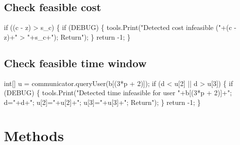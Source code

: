 \subsection{Check feasible cost}
\nwenddocs{}\endmoddef\nwstartdeflinemarkup{}\nwenddeflinemarkup
if ((c - z) > s_c) \{
  if (DEBUG) \{
    tools.Print("Detected cost infeasible ("+(c - z)+" > "+s_c+"); Return");
  \}
  return -1;
\}
\nwendcode{}\nwdocspar

\subsection{Check feasible time window}
\nwenddocs{}\endmoddef\nwstartdeflinemarkup{}\nwenddeflinemarkup
int[] u = communicator.queryUser(b[(3*p + 2)]);
if (d < u[2] || d > u[3]) \{
  if (DEBUG) \{
    tools.Print("Detected time infeasible for user "+b[(3*p + 2)]+"; d="+d+"; u[2]="+u[2]+"; u[3]="+u[3]+"; Return");
  \}
  return -1;
\}
\nwendcode{}\nwdocspar


\section{Methods}

